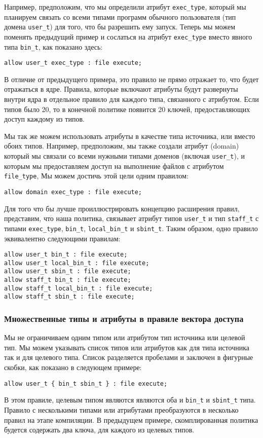 \documentclass{./../class/UIR}
\begin{document}
    Например, предположим, что мы определили атрибут \verb"exec_type", который
    мы планируем связать со всеми типами программ обычного пользователя (тип домена
    \verb"user_t") для того, что бы разрешить ему запуск. Теперь мы можем
    поменять предыдущий пример и сослаться на атрибут \verb"exec_type" вместо явного типа
    \verb"bin_t", как показано здесь:
\begin{verbatim}
allow user_t exec_type : file execute;
\end{verbatim}
    В отличие от предыдущего примера, это правило не прямо отражает то, что
    будет отражаться в ядре. Правила, которые включают атрибуты будут развернуты
    внутри ядра в отдельное правило для каждого типа, связанного с атрибутом.
    Если типов было 20, то в конечной политике появится 20 ключей,
    предоставляющих доступ каждому из типов.

    Мы так же можем использовать атрибуты в качестве типа источника, или вместо
    обоих типов. Например, предположим, мы также создали атрибут (domain)
    который мы связали со всеми нужными  типами доменов (включая \verb"user_t"),
    и которым мы предоставляем доступ на выполнение файлов с атрибутом
    \verb"file_type", Мы можем достичь этой цели одним правилом:
\begin{verbatim}
allow domain exec_type : file execute;
\end{verbatim}
    Для того что бы лучше проиллюстрировать концепцию расширения правил,
    представим, что наша политика, связывает атрибут типов \verb"user_t" и  тип
    \verb"staff_t" с типами \verb"exec_type", \verb"bin_t",  \verb"local_bin_t"
    и \verb"sbint_t". Таким образом, одно правило эквивалентно следующими
    правилам:
\begin{verbatim}
allow user_t bin_t : file execute;
allow user_t local_bin_t : file execute;
allow user_t sbin_t : file execute;
allow staff_t bin_t : file execute;
allow staff_t local_bin_t : file execute;
allow staff_t sbin_t : file execute;
\end{verbatim}
\subsubsection{Множественные типы и атрибуты в правиле вектора доступа}

    Мы не ограничиваем одним типом или атрибутом тип источника или целевой тип.
    Мы можем указывать список типов или атрибутов как для типа источника так и
    для целевого типа. Список разделяется пробелами и заключен в фигурные
    скобки, как показано в следующем примере:
\begin{verbatim}
allow user_t { bin_t sbin_t } : file execute;
\end{verbatim}
    В этом правиле, целевым типом являются являются оба и \verb"bin_t" и
    \verb"sbint_t" типа. Правило с несколькими типами или атрибутами
    преобразуются в несколько правил на этапе компиляции. В предыдущем примере,
    скомплированная политика будется содержать два ключа, для каждого из целевых
    типов.
\end{document}
